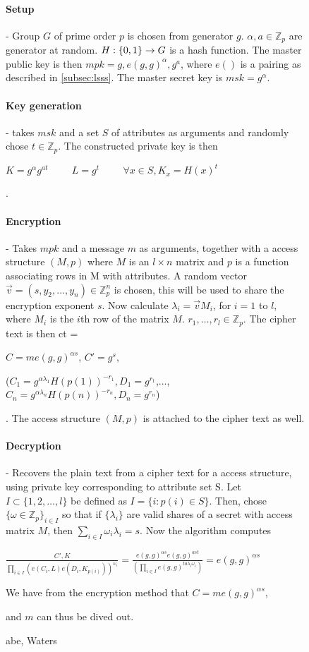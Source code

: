 \begin{figure}[H]
\begin{mdframed}
\paragraph{Setup} - Group $G$ of prime order $p$ is chosen from generator $g$. $\alpha, a \in \mathbb{Z}_p$ are generator at random. $H: \{0,1\}\* \rightarrow G$ is a hash function. The master public key is then $mpk = g, e(g,g)^{\alpha}, g^a$, where $e()$ is a pairing as described in \ref{subsec:lsss}. The master secret key is $msk = g^{\alpha}$.
\
\paragraph{Key generation} - takes $msk$ and a set $S$ of attributes as arguments and randomly chose $t \in \mathbb{Z}_p$. The constructed private key is then \\ \centerline{$K = g^{\alpha}g^{at}\hspace{1cm} L = g^t \hspace{1cm}   \forall x\in S, K_x = H(x)^t$}.
\\
\paragraph{Encryption} - Takes $mpk$ and a message $m$ as arguments, together with a access structure $(M,p)$ where $M$ is an $l\times n$ matrix and $p$ is a function associating rows in M with attributes. A random vector $\vec{v} = (s, y_2, ..., y_n)\in \mathbb{Z}_p^n$ is chosen, this will be used to share the encryption exponent $s$. Now calculate $\lambda_i = \vec{v} M_i$, for $i=1$ to $l$, where $M_i$ is the $i$th row of the matrix $M$. $r_1,\dots,r_l \in \mathbb{Z}_p$. The cipher text is then ct = \\
\centerline{$C=me(g,g)^{\alpha s}$, $C'=g^s$,}
\centerline{($C_1 = g^{\alpha \lambda_1} H(p(1))^{-r_1}, D_1=g^{r_1}$,$\dots$,$C_n = g^{\alpha \lambda_n} H(p(n))^{-r_n}, D_n=g^{r_n}$)}.
The access structure $(M,p)$ is attached to the cipher text as well.
\\
\paragraph{Decryption} - Recovers the plain text from a cipher text for a access structure, using private key corresponding to attribute set S. Let $I \subset \{1,2,\dots,l\}$ be defined as $I = \{i : p(i) \in S\}$. Then, chose $\{\omega \in \mathbb{Z}_p\}_{i\in I}$ so that if $\{\lambda_i\}$ are valid shares of a secret with access matrix $M$, then $\sum_{i\in I}\omega_i \lambda_i = s$. Now the algorithm computes
\centerline{$\frac{C',K }{\prod_{i\in I}(e(C_i,L)e(D_i,K_{p(i)}))^{\omega_i}} = \frac{e(g,g)^{\alpha s}e(g,g)^{ast}}{(\prod_{i\in I}e(g,g)^{ta\lambda_i\omega_i})}=e(g,g)^{\alpha s}$}
\centerline{We have from the encryption method that $C=me(g,g)^{\alpha s}$, }
\centerline{and $m$ can thus be dived out.}


\caption{\gls{abe}, Waters\cite{abe_waters09}}
\label{fig:abe_math}
\end{mdframed}
\end{figure}
